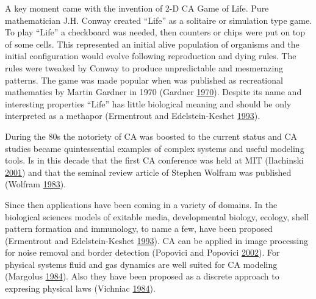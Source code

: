\documentclass[
]{book}
\begin{document}
A key moment came with the invention of 2-D CA Game of Life. Pure mathematician J.H. Conway created ``Life'' as a solitaire or simulation type game. To play ``Life'' a checkboard was needed, then counters or chips were put on top of some cells. This represented an initial alive population of organisms and the initial configuration would evolve following reproduction and dying rules. The rules were tweaked by Conway to produce unpredictable and mesmerazing patterns. The game was made popular when was published as recreational mathematics by Martin Gardner in 1970 (Gardner \protect\hyperlink{ref-gardner1970mathematical}{1970}). Despite its name and interesting properties ``Life'' has little biological meaning and should be only interpreted as a methapor (Ermentrout and Edelstein-Keshet \protect\hyperlink{ref-ermentrout1993cellular}{1993}).

During the 80s the notoriety of CA was boosted to the current status and CA studies became quintessential examples of complex systems and useful modeling tools. Is in this decade that the first CA conference was held at MIT (Ilachinski \protect\hyperlink{ref-ilachinski2001cellular}{2001}) and that the seminal review article of Stephen Wolfram was published (Wolfram \protect\hyperlink{ref-wolfram1983statistical}{1983}).

Since then applications have been coming in a variety of domains. In the biological sciences models of exitable media, developmental biology, ecology, shell pattern formation and immunology, to name a few, have been proposed (Ermentrout and Edelstein-Keshet \protect\hyperlink{ref-ermentrout1993cellular}{1993}). CA can be applied in image processing for noise removal and border detection (Popovici and Popovici \protect\hyperlink{ref-popovici2002cellular}{2002}). For physical systems fluid and gas dynamics are well suited for CA modeling (Margolus \protect\hyperlink{ref-margolus1984physics}{1984}). Also they have been proposed as a discrete approach to expresing physical laws (Vichniac \protect\hyperlink{ref-vichniac1984simulating}{1984}).
\end{document}
